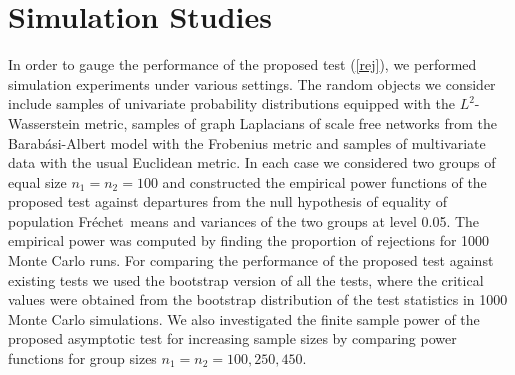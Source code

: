 \documentclass[lineno]{biometrika}
\def\cp{\citep}
\def\cp{\citep}
\def\F{Fr\'{e}chet}
\begin{document}
\section{Simulation Studies}
\label{sec: simu}
	In order to gauge the performance of the proposed test (\ref{rej}), we performed  simulation experiments under various settings. The random objects  we consider  include samples of univariate probability distributions equipped with the $L^2$-Wasserstein metric, samples of graph Laplacians of scale free networks from the Barab\'{a}si-Albert model \cp{bara:99} with the Frobenius metric and samples of multivariate data with the usual Euclidean metric. In each case we considered two groups of equal size $n_1=n_2=100$ and constructed the empirical power functions of the proposed test against departures from the null hypothesis of equality of  population \F \ means and variances of the two groups at level 0.05. The empirical power was computed by finding the proportion of rejections for 1000 Monte Carlo runs. %
	For comparing the performance of the proposed test against existing tests we used the bootstrap version of all the tests, where  the critical values were  obtained from the bootstrap distribution of the test statistics in 1000 Monte Carlo simulations. %
	We also investigated the finite sample power of the proposed asymptotic test for increasing sample sizes by comparing power functions for group sizes $n_1=n_2=100, 250, 450$.
\end{document}
